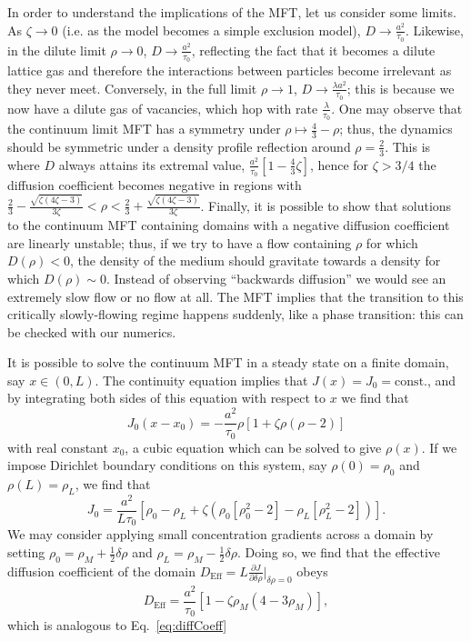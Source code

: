 \documentclass[
reprint,
 amsmath,amssymb,
 aps,
 prl,
]{revtex4-1}
\newcommand{\partDeriv}[2]{\frac{\partial #1}{\partial #2}}
\begin{document}
In order to understand the implications of the MFT, let us consider some limits. As $\zeta \rightarrow 0$ (i.e. as the model becomes a simple exclusion model), $D \rightarrow \frac{a^2}{\tau_0}$. Likewise, in the
dilute limit $\rho \rightarrow 0$, $D \rightarrow \frac{ a^2}{\tau_0}$, reflecting the fact that it becomes a dilute lattice gas and therefore the interactions between particles become irrelevant as they never meet.
Conversely, in the full limit $\rho \rightarrow 1$, $D \rightarrow \frac{\lambda a^2}{\tau_0}$; this is because we now have a dilute gas of vacancies, which hop with rate $\frac{\lambda}{\tau_0}$.
One may observe that the continuum limit MFT has a symmetry under $\rho \mapsto \frac{4}{3} - \rho$; thus, the dynamics should be symmetric under a density profile reflection around $\rho = \frac{2}{3}$. This is where $D$ always
attains its extremal value, $ \frac{a^2}{\tau_0}\left[1 - \frac{4}{3}\zeta\right]$, hence for $\zeta>3/4$ the diffusion coefficient becomes negative in regions with
$\frac{2}{3} - \frac{\sqrt{\zeta\left(4\zeta - 3\right)}}{3\zeta} < \rho < \frac{2}{3} + \frac{\sqrt{\zeta\left(4\zeta - 3\right)}}{3\zeta}$.
Finally, it is possible to show that solutions to the continuum MFT containing domains with a negative diffusion coefficient are linearly unstable; thus, if we try to have a flow containing $\rho$ for which $D(\rho)<0$,
the density of the medium should gravitate towards a density for which $D(\rho)\sim 0$. Instead of observing ``backwards diffusion'' we would see an extremely slow flow or no flow at all. The MFT implies that the transition
to this critically slowly-flowing regime happens suddenly, like a phase transition: this can be checked with our numerics.

It is possible to solve the continuum MFT in a steady state on a finite domain, say $x\in(0, L)$. The continuity equation implies that $J(x)=J_0=\mathrm{const.}$, and by integrating both sides of this equation with respect to $x$ we find that
\begin{equation}
 J_0 (x-x_0) = -\frac{a^2}{\tau_0} \rho \left[1+\zeta \rho\left(\rho-2\right)\right]
\end{equation}
with real constant $x_0$,
a cubic equation which can be solved to give $\rho(x)$. If we impose Dirichlet boundary conditions on this system, say $\rho(0)=\rho_0$ and $\rho(L)=\rho_L$, we find that
\begin{equation}
 J_0 = \frac{a^2}{L \tau_0} \left[ \rho_0 - \rho_L + \zeta \left( \rho_0\left[\rho_0^2-2\right] - \rho_L\left[\rho_L^2-2\right] \right) \right].
\end{equation}
We may consider applying small concentration gradients across a domain by setting $\rho_0 = \rho_M + \frac{1}{2}\delta\rho$ and $\rho_L = \rho_M - \frac{1}{2}\delta\rho$. Doing so, we find that the effective diffusion coefficient of the domain
$D_\mathrm{Eff}=L \partDeriv{J}{\delta\rho}\big|_{\delta\rho=0}$ obeys
\begin{equation}
\label{eq:MFTflow}
 D_\mathrm{Eff} = \frac{a^2}{ \tau_0} \left[ 1 - \zeta\rho_M(4-3\rho_M) \right],
\end{equation}
which is analogous to Eq.~\ref{eq:diffCoeff}
\end{document}
